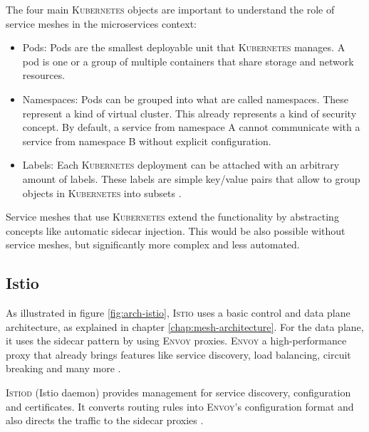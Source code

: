 The four main \textsc{Kubernetes} objects are important to understand the role of service meshes in the microservices context:
\begin{itemize}
\item Pods: Pods are the smallest deployable unit that \textsc{Kubernetes} manages. A pod is one or a group of multiple containers that share storage and network resources.
\item Namespaces: Pods can be grouped into what are called namespaces. These represent a kind of virtual cluster. This already represents a kind of security concept. By default, a service from namespace A cannot communicate with a service from namespace B without explicit configuration.
\item Labels: Each \textsc{Kubernetes} deployment can be attached with an arbitrary amount of labels. These labels are simple key/value pairs that allow to group objects in \textsc{Kubernetes} into subsets \cite{k8s}.
\end{itemize}

Service meshes that use \textsc{Kubernetes} extend the functionality by abstracting concepts like automatic sidecar injection. This would be also possible without service meshes, but significantly more complex and less automated.

\subsection{Istio}

As illustrated in figure \ref{fig:arch-istio}, \textsc{Istio} uses a basic control and data plane architecture, as explained in chapter \ref{chap:mesh-architecture}. For the data plane, it uses the sidecar pattern by using \textsc{Envoy} proxies. \textsc{Envoy} a high-performance proxy that already brings features like service discovery, load balancing, circuit breaking and many more \cite{istio-docs-arch}.

\textsc{Istiod} (Istio daemon) provides management for service discovery, configuration and certificates. It converts routing rules into \textsc{Envoy}'s configuration format and also directs the traffic to the sidecar proxies \cite{istio-docs-arch}.

